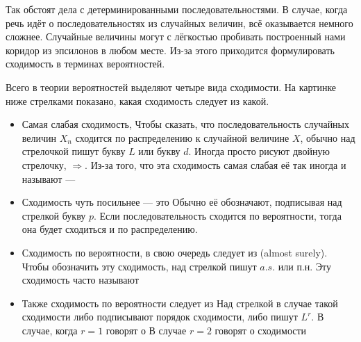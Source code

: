 \documentclass[12pt, a4paper, oneside]{article}
\begin{document}
Так обстоят дела с детерминированными последовательностями. В случае, когда речь идёт о последовательностях из случайных величин, всё оказывается немного сложнее. Случайные величины могут с лёгкостью пробивать построенный нами коридор из эпсилонов в любом месте. Из-за этого приходится формулировать сходимость в терминах вероятностей. 

Всего в теории вероятностей выделяют четыре вида сходимости. На картинке ниже стрелками показано, какая сходимость следует из какой. 

\begin{center} 
\end{center} 

\begin{itemize} 
\item Самая слабая сходимость,  Чтобы сказать, что последовательность случайных величин $X_n$ сходится по распределению к случайной величине $X$, обычно над стрелочкой пишут букву $L$ или букву $d$. Иногда просто рисуют двойную стрелочку, $\Rightarrow$. Из-за того, что эта сходимость самая слабая её так иногда и называют --- 

\item Сходимость чуть посильнее --- это  Обычно её обозначают, подписывая над стрелкой букву $p$. Если последовательность сходится по вероятности, тогда она будет сходиться и по распределению. 

\item Сходимость по вероятности, в свою очередь следует из  (almost surely). Чтобы обозначить эту сходимость, над стрелкой пишут $a.s.$ или п.н. Эту сходимость часто называют  

\item Также сходимость по вероятности следует из  Над стрелкой в случае такой сходимости либо подписывают порядок сходимости, либо пишут $L^r$. В случае, когда $r=1$ говорят о  В случае $r=2$ говорят о сходимости 
\end{itemize} 
\end{document}
